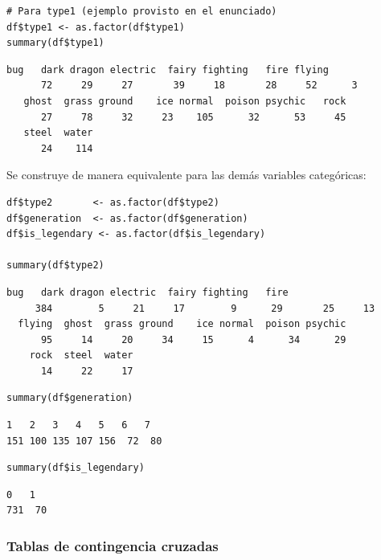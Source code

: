 \documentclass[11pt,a4paper]{article}
\begin{document}
\begin{lstlisting}[style=Rstyle]
# Para type1 (ejemplo provisto en el enunciado)
df$type1 <- as.factor(df$type1)
summary(df$type1)
\end{lstlisting}

\begin{lstlisting}[style=Routput]
     bug   dark dragon electric  fairy fighting   fire flying
      72     29     27       39     18       28     52      3
   ghost  grass ground    ice normal  poison psychic   rock
      27     78     32     23    105      32      53     45
   steel  water
      24    114
\end{lstlisting}

Se construye de manera equivalente para las demás variables categóricas:

\begin{lstlisting}[style=Rstyle]
df$type2       <- as.factor(df$type2)
df$generation  <- as.factor(df$generation)
df$is_legendary <- as.factor(df$is_legendary)

summary(df$type2)
\end{lstlisting}

\begin{lstlisting}[style=Routput]
              bug   dark dragon electric  fairy fighting   fire
     384        5     21     17        9      29       25     13
  flying  ghost  grass ground    ice normal  poison psychic
      95     14     20     34     15      4      34      29
    rock  steel  water
      14     22     17
\end{lstlisting}

\begin{lstlisting}[style=Rstyle]
summary(df$generation)
\end{lstlisting}

\begin{lstlisting}[style=Routput]
  1   2   3   4   5   6   7
151 100 135 107 156  72  80
\end{lstlisting}

\begin{lstlisting}[style=Rstyle]
summary(df$is_legendary)
\end{lstlisting}

\begin{lstlisting}[style=Routput]
  0   1
731  70
\end{lstlisting}

\subsubsection{Tablas de contingencia cruzadas}
\end{document}
